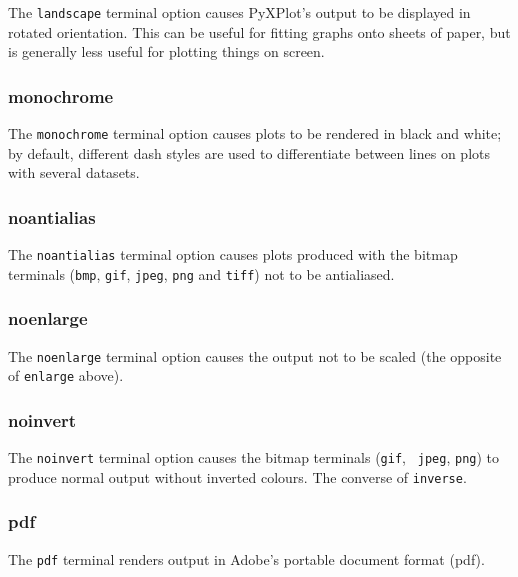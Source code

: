 The {\tt landscape} terminal option causes PyXPlot's output to be displayed in
rotated orientation.  This can be useful for fitting graphs onto sheets of
paper, but is generally less useful for plotting things on screen.


\subsubsection{monochrome}

The {\tt monochrome} terminal option causes plots to be rendered in black and
white; by default, different dash styles are used to differentiate between
lines on plots with several datasets.


\subsubsection{noantialias}

The {\tt noantialias} terminal option causes plots produced with the bitmap
terminals ({\tt bmp}, {\tt gif}, {\tt jpeg}, {\tt png} and {\tt tiff}) not to
be antialiased.


\subsubsection{noenlarge}

The {\tt noenlarge} terminal option causes the output not to be scaled (the
opposite of {\tt enlarge} above).


\subsubsection{noinvert}

The {\tt noinvert} terminal option causes the bitmap terminals ({\tt gif}, {\tt
jpeg}, {\tt png}) to produce normal output without inverted colours. The
converse of {\tt inverse}.


\subsubsection{pdf}

The {\tt pdf} terminal renders output in Adobe's portable document format
(pdf).


